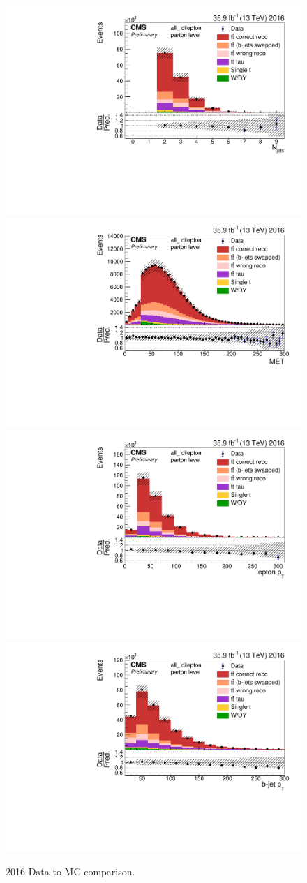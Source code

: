 \begin{figure}[h]
    \centering
    \includegraphics[width=.44\linewidth]{control/16_all_Njets.pdf}
    \includegraphics[width=.44\linewidth]{control/16_all_MET.pdf}
    \includegraphics[width=.44\linewidth]{control/16_all_lep_pt.pdf}
    \includegraphics[width=.44\linewidth]{control/16_all_bj_Pt.pdf}
    \caption{2016 Data to MC comparison.}
    \label{fig:dmcpre_16}
\end{figure}


